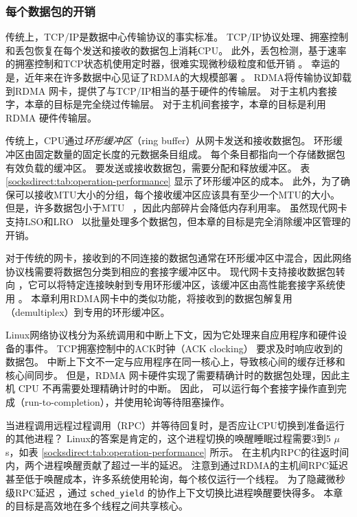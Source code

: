 \subsubsection{每个数据包的开销}
\label{socksdirect:subsec:per-packet-overhead}

传统上，TCP/IP是数据中心传输协议的事实标准。
TCP/IP协议处理、拥塞控制和丢包恢复在每个发送和接收的数据包上消耗CPU。
此外，丢包检测，基于速率的拥塞控制和TCP状态机使用定时器，很难实现微秒级粒度和低开销 \cite{jeong2014mtcp}。
幸运的是，近年来在许多数据中心见证了RDMA的大规模部署 \cite {guo2016rdma,zhu2015congestion,mittal2015timely}。
RDMA将传输协议卸载到RDMA 网卡，提供了与TCP/IP相当的基于硬件的传输层。
对于主机内套接字，本章的目标是完全绕过传输层。
对于主机间套接字，本章的目标是利用 RDMA 硬件传输层。

传统上，CPU通过\emph {环形缓冲区}（ring buffer）从网卡发送和接收数据包。
环形缓冲区由固定数量的固定长度的元数据条目组成。
每个条目都指向一个存储数据包有效负载的缓冲区。
要发送或接收数据包，需要分配和释放缓冲区。
表 \ref {socksdirect:tab:operation-performance} 显示了环形缓冲区的成本。
此外，为了确保可以接收MTU大小的分组，每个接收缓冲区应该具有至少一个MTU的大小。
但是，许多数据包小于MTU~ \cite {thompson1997wide}，因此内部碎片会降低内存利用率。
虽然现代网卡支持LSO和LRO~ \cite {lsolro} 以批量处理多个数据包，但本章的目标是完全消除缓冲区管理的开销。

对于传统的网卡，接收到的不同连接的数据包通常在环形缓冲区中混合，因此网络协议栈需要将数据包分类到相应的套接字缓冲区中。
现代网卡支持接收数据包转向 \cite {mellanox}，它可以将特定连接映射到专用环形缓冲区，该缓冲区由高性能套接字系统使用 \cite {jeong2014mtcp,lin2016scalable,libvma}。
本章利用RDMA网卡中的类似功能，将接收到的数据包解复用（demultiplex）到专用的环形缓冲区。

Linux网络协议栈分为系统调用和中断上下文，因为它处理来自应用程序和硬件设备的事件。
TCP拥塞控制中的ACK时钟（ACK clocking）\cite {mprdma} 要求及时响应收到的数据包。
中断上下文不一定与应用程序在同一核心上，导致核心间的缓存迁移和核心间同步。
但是，RDMA 网卡硬件实现了需要精确计时的数据包处理，因此主机 CPU 不再需要处理精确计时的中断。
因此，\libipc {} 可以运行每个套接字操作直到完成（run-to-completion），并使用轮询等待阻塞操作。



当进程调用远程过程调用（RPC）并等待回复时，是否应让CPU切换到准备运行的其他进程？
Linux的答案是肯定的，这个进程切换的唤醒睡眠过程需要3到5 $\mu$s，如表 \ref {socksdirect:tab:operation-performance} 所示。
在主机内RPC的往返时间内，两个进程唤醒贡献了超过一半的延迟。
注意到通过RDMA的主机间RPC延迟甚至低于唤醒成本，许多系统使用轮询，每个核仅运行一个线程。
为了隐藏微秒级RPC延迟 \cite {barroso2017attack}，通过 \texttt {sched\_yield} 的协作上下文切换比进程唤醒要快得多。
本章的目标是高效地在多个线程之间共享核心。

